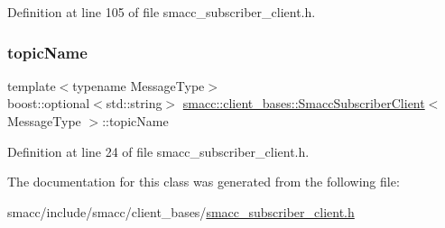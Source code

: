 Definition at line 105 of file smacc\+\_\+subscriber\+\_\+client.\+h.

\mbox{\label{classsmacc_1_1client__bases_1_1SmaccSubscriberClient_aeadf21a09412c6c9488e5acd50fb4f40}} 
\subsubsection{\texorpdfstring{topic\+Name}{topicName}}
{\footnotesize\ttfamily template$<$typename Message\+Type$>$ \\
boost\+::optional$<$std\+::string$>$ \hyperlink{classsmacc_1_1client__bases_1_1SmaccSubscriberClient}{smacc\+::client\+\_\+bases\+::\+Smacc\+Subscriber\+Client}$<$ Message\+Type $>$\+::topic\+Name}



Definition at line 24 of file smacc\+\_\+subscriber\+\_\+client.\+h.



The documentation for this class was generated from the following file\+:\begin{DoxyCompactItemize}
\item 
smacc/include/smacc/client\+\_\+bases/\hyperlink{smacc__subscriber__client_8h}{smacc\+\_\+subscriber\+\_\+client.\+h}\end{DoxyCompactItemize}
